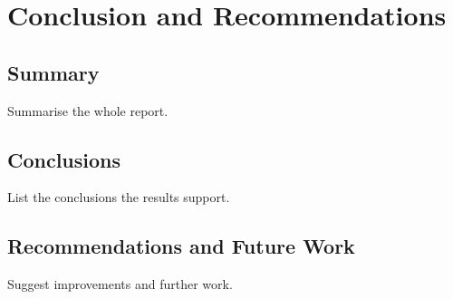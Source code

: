 \chapter{Conclusion and Recommendations}\label{ch:conclusion}

\section{Summary}
Summarise the whole report.

\section{Conclusions}
List the conclusions the results support.

\section{Recommendations and Future Work}
Suggest improvements and further work.
